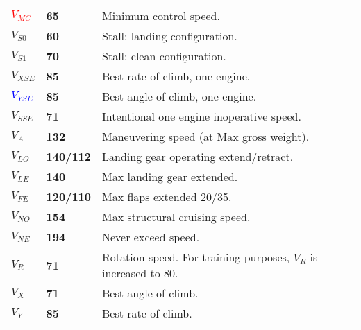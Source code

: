 \begin{table}[h]
\centering
\begin{tabular}{lll}
\textcolor{red}{\textbf{$V_{MC}$}}      & \textbf{65}      & Minimum control speed.                                           \\
\textbf{$V_{S0}$}                       & \textbf{60}      & Stall: landing configuration.                                    \\
\textbf{$V_{S1}$}                       & \textbf{70}      & Stall: clean configuration.                                      \\
\textbf{$V_{XSE}$}                      & \textbf{85}      & Best rate of climb, one engine.                                  \\
\textcolor{blue}{\textbf{$V_{YSE}$}}    & \textbf{85}      & Best angle of climb, one engine.                                 \\ \hline
\multicolumn{1}{|l}{\textbf{$V_{SSE}$}} & \textbf{71}      & \multicolumn{1}{l|}{Intentional one engine inoperative speed.}   \\ \hline
\textbf{$V_A$}                          & \textbf{132}     & Maneuvering speed (at Max gross weight).                         \\
\textbf{$V_{LO}$}                       & \textbf{140/112} & Landing gear operating extend/retract.                           \\
\textbf{$V_{LE}$}                       & \textbf{140}     & Max landing gear extended.                                       \\
\textbf{$V_{FE}$}                       & \textbf{120/110} & Max flaps extended 20/35.                                        \\
\textbf{$V_{NO}$}                       & \textbf{154}     & Max structural cruising speed.                                   \\
\textbf{$V_{NE}$}                       & \textbf{194}     & Never exceed speed.                                              \\
\textbf{$V_R$}                          & \textbf{71}      & Rotation speed. For training purposes, $V_R$ is increased to 80. \\
\textbf{$V_X$}                          & \textbf{71}      & Best angle of climb.                                             \\
\textbf{$V_Y$}                          & \textbf{85}      & Best rate of climb.                                              \\

\end{tabular}
\end{table}
